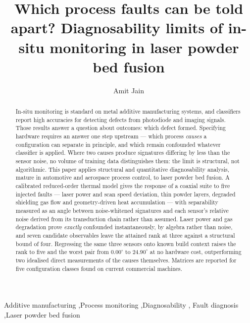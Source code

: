 \documentclass[preprint,times]{elsarticle}
\begin{document}
\begin{frontmatter}

\title{Which process faults can be told apart? Diagnosability limits of
in-situ monitoring in laser powder bed fusion}

\author[a]{Amit Jain}

\begin{abstract}
In-situ monitoring is standard on metal additive manufacturing systems, and
classifiers report high accuracies for detecting defects from photodiode and
imaging signals. Those results answer a question about outcomes: which defect
formed. Specifying hardware requires an answer one step upstream --- which process
\emph{causes} a configuration can separate in principle, and which remain
confounded whatever classifier is applied. Where two causes produce signatures
differing by less than the sensor noise, no volume of training data distinguishes
them: the limit is structural, not algorithmic. This paper applies structural and
quantitative diagnosability analysis, mature in automotive and aerospace process
control, to laser powder bed fusion. A calibrated reduced-order thermal model
gives the response of a coaxial suite to five injected faults --- laser power and
scan speed deviation, thin powder layers, degraded shielding gas flow and
geometry-driven heat accumulation --- with separability measured as an angle
between noise-whitened signatures and each sensor's relative noise derived from
its transduction chain rather than assumed. Laser power and gas degradation prove
\emph{exactly} confounded instantaneously, by algebra rather than noise, and
seven candidate observables leave the attained rank at three against a structural
bound of four. Regressing the same three sensors onto known build context raises
the rank to five and the worst pair from $0.00^\circ$ to $24.90^\circ$ at no
hardware cost, outperforming two idealised direct measurements of the causes
themselves. Matrices are reported for five configuration classes found on current
commercial machines.
\end{abstract}

\begin{keyword}
Additive manufacturing \sep Process monitoring \sep Diagnosability \sep
Fault diagnosis \sep Laser powder bed fusion
\end{keyword}

\end{frontmatter}
\end{document}
